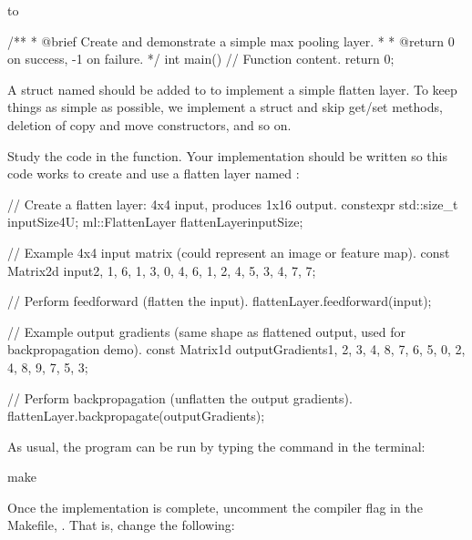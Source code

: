 \noindent to

\begin{cppcode}
/**
 * @brief Create and demonstrate a simple max pooling layer.
 *
 * @return 0 on success, -1 on failure.
 */
int main()
{
    // Function content.
    return 0;
}
\end{cppcode}

\label{c7:set:3}\label{c7:app:c}

\label{c7:ex:4}
A struct named  should be added to
 to implement a simple flatten layer. To keep
things as simple as possible, we implement a struct and skip get/set methods, deletion of copy and
move constructors, and so on.

Study the code in the  function. Your implementation should be written so this code
works to create and use a flatten layer named :

\begin{cppcode}
// Create a flatten layer: 4x4 input, produces 1x16 output.
constexpr std::size_t inputSize{4U};
ml::FlattenLayer flattenLayer{inputSize};

// Example 4x4 input matrix (could represent an image or feature map).
const Matrix2d input{{2, 1, 6, 1},
                     {3, 0, 4, 6},
                     {1, 2, 4, 5},
                     {3, 4, 7, 7}};

// Perform feedforward (flatten the input).
flattenLayer.feedforward(input);

// Example output gradients (same shape as flattened output, used for backpropagation demo).
const Matrix1d outputGradients{1, 2, 3, 4, 8, 7, 6, 5, 0, 2, 4, 8, 9, 7, 5, 3};

// Perform backpropagation (unflatten the output gradients).
flattenLayer.backpropagate(outputGradients);
\end{cppcode}

\label{c7:ex:5}
As usual, the program can be run by typing the command  in the terminal:

\begin{shell}
make
\end{shell}

\noindent Once the implementation is complete, uncomment the compiler flag  in the
Makefile, . That is, change the following:

